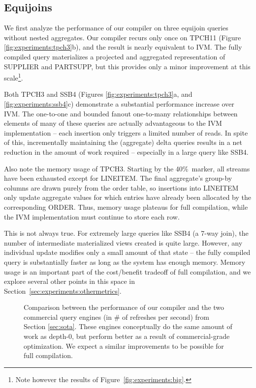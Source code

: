 \subsection{Equijoins}

We first analyze the performance of our compiler on three equijoin queries without nested aggregates.  Our compiler recurs only once on TPCH11 (Figure \ref{fig:experiments:tpch3}b), and the result is nearly equivalent to IVM.  The fully compiled query materializes a projected and aggregated representation of SUPPLIER and PARTSUPP, but this provides only a minor improvement at this scale\footnote{Note however the results of Figure~\ref{fig:experiments:big}.}.  

Both TPCH3 and SSB4 (Figures \ref{fig:experiments:tpch3}a, and \ref{fig:experiments:ssb4}c) demonstrate a substantial performance increase over IVM.  The one-to-one and bounded fanout one-to-many relationships between elements of many of these queries are actually advantageous to the IVM implementation -- each insertion only triggers a limited number of reads.  In spite of this, incrementally maintaining the (aggregate) delta queries results in a net reduction in the amount of work required -- especially in a large query like SSB4.

Also note the memory usage of TPCH3.  Starting by the 40\%\ marker, all streams have been exhausted except for LINEITEM.  The final aggregate's group-by columns are drawn purely from the order table, so insertions into LINEITEM only update aggregate values for which entries have already been allocated by the corresponding ORDER.  Thus, memory usage plateaus for full compilation, while the IVM implementation must continue to store each row.

This is not always true.  For extremely large queries like SSB4 (a 7-way join), the number of intermediate materialized views created is quite large.  However, any individual update modifies only a small amount of that state -- the fully compiled query is substantially faster as long as the system has enough memory.    Memory usage is an important part of the cost/benefit tradeoff of full compilation, and we explore several other points in this space in Section~\ref{sec:experiments:othermetrics}.  
\begin{figure}
\begin{center}
\resizebox{3.3in}{!}{

}
\caption{Comparison between the performance of our compiler and the two commercial query engines (in \# of refreshes per second) from Section \ref{sec:sota}.  These engines conceptually do the same amount of work as depth-0, but perform better as a result of commercial-grade optimization.  We expect a similar improvements to be possible for full compilation.}
\label{fig:experiments:enginesVsDBT}
\vspace*{-0.3in}
\end{center}
\end{figure}

